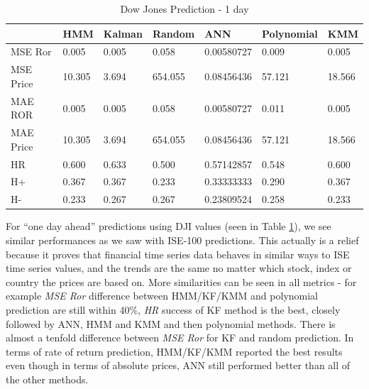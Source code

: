 \begin{table}[h]
\caption{\label{table4}Dow Jones Prediction - 1 day}
\vspace{0.3cm}
\begin{tabular}{|l|l|l|l|l|l|l|}
\hline
 &                  HMM &       Kalman &   Random &        ANN &     Polynomial &    KMM\\
\hline
   MSE Ror &      0.005 &      0.005 &      0.058 & 0.00580727 &      0.009 &      0.005\\
\hline
 MSE Price &     10.305 &      3.694 &    654.055 & 0.08456436 &     57.121 &     18.566\\
\hline
   MAE ROR &      0.005 &      0.005 &      0.058 & 0.00580727 &      0.011 &      0.005\\
\hline
 MAE Price &     10.305 &      3.694 &    654.055 & 0.08456436 &     57.121 &     18.566\\
\hline
        HR &      0.600 &      0.633 &      0.500 & 0.57142857 &      0.548 &      0.600\\
\hline
        H+ &      0.367 &      0.367 &      0.233 & 0.33333333 &      0.290 &      0.367\\
\hline
        H- &      0.233 &      0.267 &      0.267 & 0.23809524 &      0.258 &      0.233\\
\hline
\end{tabular}
\end{table}

For ``one day ahead'' predictions using DJI values (seen in Table \ref{table4}),
we see similar performances as we saw with ISE-100 predictions. This actually is
a relief because it proves that financial time series data behaves in similar
ways to ISE time series values, and the trends are the same no matter which
stock, index or country the prices are based on. More similarities can be seen
in all metrics - for example {\em MSE Ror} difference between HMM/KF/KMM and
polynomial prediction are still within 40\%, {\em HR} success of KF method is
the best, closely followed by ANN, HMM and KMM and then polynomial
methods. There is almost a tenfold difference between {\em MSE Ror} for KF and
random prediction. In terms of rate of return prediction, HMM/KF/KMM reported
the best results even though in terms of absolute prices, ANN still performed
better than all of the other methods. 

